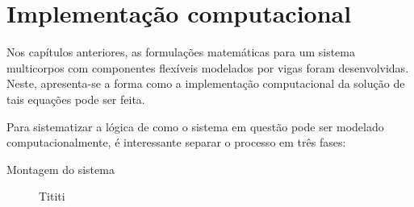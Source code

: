 \chapter{Implementação computacional}

Nos capítulos anteriores, as formulações matemáticas para um sistema multicorpos com componentes flexíveis
modelados por vigas foram desenvolvidas. Neste, apresenta-se a forma como a implementação computacional da solução de tais equações 
pode ser feita.

Para sistematizar a lógica de como o sistema em questão pode ser modelado computacionalmente, é interessante separar o processo
em três fases:
\begin{description}
\item[Montagem do sistema]{Tititi}
\end{description}